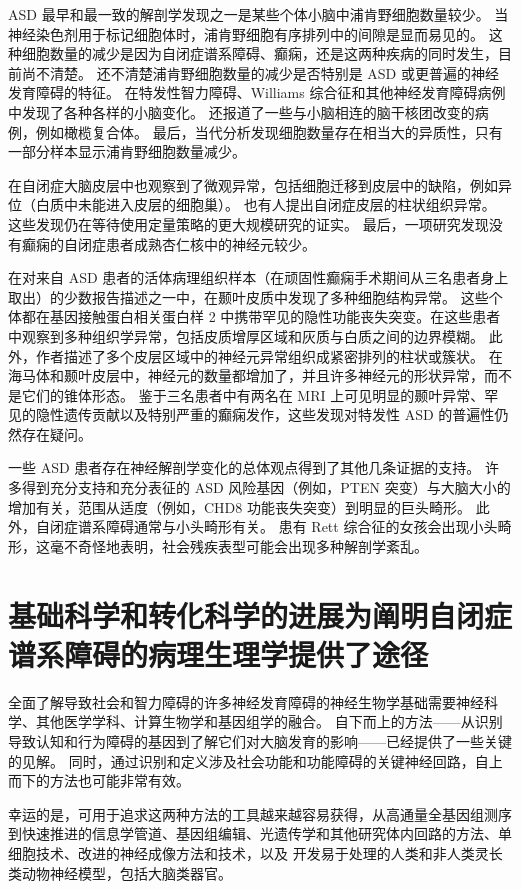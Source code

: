 ASD 最早和最一致的解剖学发现之一是某些个体小脑中浦肯野细胞数量较少。 当神经染色剂用于标记细胞体时，浦肯野细胞有序排列中的间隙是显而易见的。 这种细胞数量的减少是因为自闭症谱系障碍、癫痫，还是这两种疾病的同时发生，目前尚不清楚。 还不清楚浦肯野细胞数量的减少是否特别是 ASD 或更普遍的神经发育障碍的特征。 在特发性智力障碍、Williams 综合征和其他神经发育障碍病例中发现了各种各样的小脑变化。 还报道了一些与小脑相连的脑干核团改变的病例，例如橄榄复合体。 最后，当代分析发现细胞数量存在相当大的异质性，只有一部分样本显示浦肯野细胞数量减少。

在自闭症大脑皮层中也观察到了微观异常，包括细胞迁移到皮层中的缺陷，例如异位（白质中未能进入皮层的细胞巢）。 也有人提出自闭症皮层的柱状组织异常。 这些发现仍在等待使用定量策略的更大规模研究的证实。 最后，一项研究发现没有癫痫的自闭症患者成熟杏仁核中的神经元较少。

在对来自 ASD 患者的活体病理组织样本（在顽固性癫痫手术期间从三名患者身上取出）的少数报告描述之一中，在颞叶皮质中发现了多种细胞结构异常。 这些个体都在基因接触蛋白相关蛋白样 2 中携带罕见的隐性功能丧失突变。在这些患者中观察到多种组织学异常，包括皮质增厚区域和灰质与白质之间的边界模糊。 此外，作者描述了多个皮层区域中的神经元异常组织成紧密排列的柱状或簇状。 在海马体和颞叶皮层中，神经元的数量都增加了，并且许多神经元的形状异常，而不是它们的锥体形态。 鉴于三名患者中有两名在 MRI 上可见明显的颞叶异常、罕见的隐性遗传贡献以及特别严重的癫痫发作，这些发现对特发性 ASD 的普遍性仍然存在疑问。

一些 ASD 患者存在神经解剖学变化的总体观点得到了其他几条证据的支持。 许多得到充分支持和充分表征的 ASD 风险基因（例如，PTEN 突变）与大脑大小的增加有关，范围从适度（例如，CHD8 功能丧失突变）到明显的巨头畸形。 此外，自闭症谱系障碍通常与小头畸形有关。 患有 Rett 综合征的女孩会出现小头畸形，这毫不奇怪地表明，社会残疾表型可能会出现多种解剖学紊乱。

\section{基础科学和转化科学的进展为阐明自闭症谱系障碍的病理生理学提供了途径}
全面了解导致社会和智力障碍的许多神经发育障碍的神经生物学基础需要神经科学、其他医学学科、计算生物学和基因组学的融合。 自下而上的方法——从识别导致认知和行为障碍的基因到了解它们对大脑发育的影响——已经提供了一些关键的见解。 同时，通过识别和定义涉及社会功能和功能障碍的关键神经回路，自上而下的方法也可能非常有效。

幸运的是，可用于追求这两种方法的工具越来越容易获得，从高通量全基因组测序到快速推进的信息学管道、基因组编辑、光遗传学和其他研究体内回路的方法、单细胞技术、改进的神经成像方法和技术，以及 开发易于处理的人类和非人类灵长类动物神经模型，包括大脑类器官。

